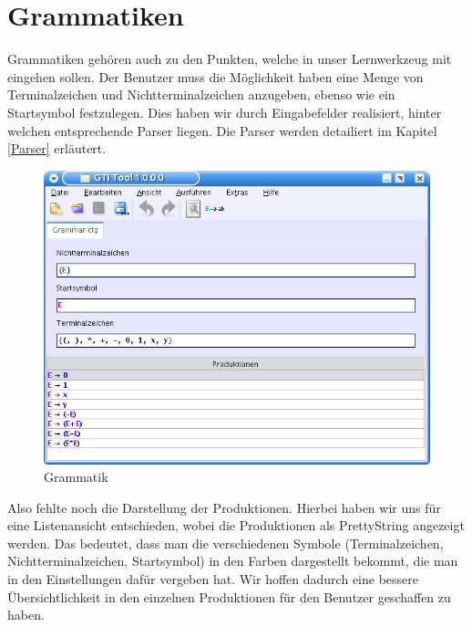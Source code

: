 

\chapter{Grammatiken}\label{Grammars}

Grammatiken gehören auch zu den Punkten, welche in unser Lernwerkzeug mit
eingehen sollen. Der Benutzer muss die Möglichkeit haben eine Menge von
Terminalzeichen und Nichtterminalzeichen anzugeben, ebenso wie ein Startsymbol
festzulegen. Dies haben wir durch Eingabefelder realisiert, hinter welchen
entsprechende Parser liegen. Die Parser werden detailiert im Kapitel
\ref{Parser} erläutert.\vspace{10pt}

\begin{figure}[h!]
\begin{center}
\includegraphics[width=12cm]{../images/cfg_example.png}
\caption{Grammatik}
\end{center}
\end{figure}
\vspace{10pt}

Also fehlte noch die Darstellung der Produktionen. Hierbei haben wir uns für
eine Listenansicht entschieden, wobei die Produktionen als PrettyString
angezeigt werden. Das bedeutet, dass man die verschiedenen Symbole
(Terminalzeichen, Nichtterminalzeichen, Startsymbol) in den Farben dargestellt
bekommt, die man in den Einstellungen dafür vergeben hat. Wir hoffen dadurch
eine bessere Übersichtlichkeit in den einzelnen Produktionen für den Benutzer
geschaffen zu haben.\vspace{10pt}

